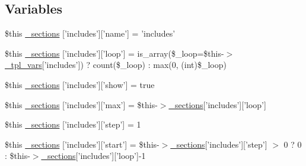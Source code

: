 \subsection*{\-Variables}
\begin{DoxyCompactItemize}
\item 
\$this \hyperlink{34d6fa4bfd5eef6424a9ddc74a166350_2_06_06176_05_06_061767056382_05include_8tpl_8php_a42ca7b4750948906f9467ef3d2ef626a}{\-\_\-sections} \mbox{[}'includes'\mbox{]}\mbox{[}'name'\mbox{]} = 'includes'
\item 
\$this \hyperlink{34d6fa4bfd5eef6424a9ddc74a166350_2_06_06176_05_06_061767056382_05include_8tpl_8php_a6165925f226253acd82e451b4e38b8c4}{\-\_\-sections} \mbox{[}'includes'\mbox{]}\mbox{[}'loop'\mbox{]} = is\-\_\-array(\$\-\_\-loop=\$this-\/$>$\hyperlink{_06_06127_05_06_0612781687_05pkgelementindex_8tpl_8php_a4a4846d8e68d455590131a05697f67a3}{\-\_\-tpl\-\_\-vars}\mbox{[}'includes'\mbox{]}) ? count(\$\-\_\-loop) \-: max(0, (int)\$\-\_\-loop)
\item 
\$this \hyperlink{34d6fa4bfd5eef6424a9ddc74a166350_2_06_06176_05_06_061767056382_05include_8tpl_8php_a890296d548cee37e6047b68403f77d63}{\-\_\-sections} \mbox{[}'includes'\mbox{]}\mbox{[}'show'\mbox{]} = true
\item 
\$this \hyperlink{34d6fa4bfd5eef6424a9ddc74a166350_2_06_06176_05_06_061767056382_05include_8tpl_8php_afa98952c2805af1b15e2d1750084cad6}{\-\_\-sections} \mbox{[}'includes'\mbox{]}\mbox{[}'max'\mbox{]} = \$this-\/$>$\hyperlink{_06_06127_05_06_0612781687_05pkgelementindex_8tpl_8php_a9e3d26b39edfe29c3f29b8035ef33828}{\-\_\-sections}\mbox{[}'includes'\mbox{]}\mbox{[}'loop'\mbox{]}
\item 
\$this \hyperlink{34d6fa4bfd5eef6424a9ddc74a166350_2_06_06176_05_06_061767056382_05include_8tpl_8php_a3d18d8efa906a295c53f569591b27592}{\-\_\-sections} \mbox{[}'includes'\mbox{]}\mbox{[}'step'\mbox{]} = 1
\item 
\$this \hyperlink{34d6fa4bfd5eef6424a9ddc74a166350_2_06_06176_05_06_061767056382_05include_8tpl_8php_a0e2e77601249107999f96703994e1c8c}{\-\_\-sections} \mbox{[}'includes'\mbox{]}\mbox{[}'start'\mbox{]} = \$this-\/$>$\hyperlink{_06_06127_05_06_0612781687_05pkgelementindex_8tpl_8php_a9e3d26b39edfe29c3f29b8035ef33828}{\-\_\-sections}\mbox{[}'includes'\mbox{]}\mbox{[}'step'\mbox{]} $>$ 0 ? 0 \-: \$this-\/$>$\hyperlink{_06_06127_05_06_0612781687_05pkgelementindex_8tpl_8php_a9e3d26b39edfe29c3f29b8035ef33828}{\-\_\-sections}\mbox{[}'includes'\mbox{]}\mbox{[}'loop'\mbox{]}-\/1
\item 

\end{DoxyCompactItemize}
